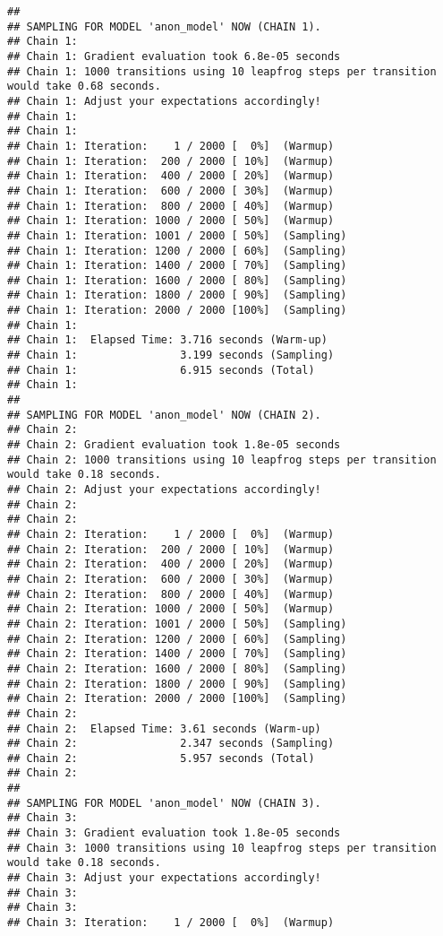 \documentclass[
]{article}
\begin{document}
\begin{verbatim}
## 
## SAMPLING FOR MODEL 'anon_model' NOW (CHAIN 1).
## Chain 1: 
## Chain 1: Gradient evaluation took 6.8e-05 seconds
## Chain 1: 1000 transitions using 10 leapfrog steps per transition would take 0.68 seconds.
## Chain 1: Adjust your expectations accordingly!
## Chain 1: 
## Chain 1: 
## Chain 1: Iteration:    1 / 2000 [  0%]  (Warmup)
## Chain 1: Iteration:  200 / 2000 [ 10%]  (Warmup)
## Chain 1: Iteration:  400 / 2000 [ 20%]  (Warmup)
## Chain 1: Iteration:  600 / 2000 [ 30%]  (Warmup)
## Chain 1: Iteration:  800 / 2000 [ 40%]  (Warmup)
## Chain 1: Iteration: 1000 / 2000 [ 50%]  (Warmup)
## Chain 1: Iteration: 1001 / 2000 [ 50%]  (Sampling)
## Chain 1: Iteration: 1200 / 2000 [ 60%]  (Sampling)
## Chain 1: Iteration: 1400 / 2000 [ 70%]  (Sampling)
## Chain 1: Iteration: 1600 / 2000 [ 80%]  (Sampling)
## Chain 1: Iteration: 1800 / 2000 [ 90%]  (Sampling)
## Chain 1: Iteration: 2000 / 2000 [100%]  (Sampling)
## Chain 1: 
## Chain 1:  Elapsed Time: 3.716 seconds (Warm-up)
## Chain 1:                3.199 seconds (Sampling)
## Chain 1:                6.915 seconds (Total)
## Chain 1: 
## 
## SAMPLING FOR MODEL 'anon_model' NOW (CHAIN 2).
## Chain 2: 
## Chain 2: Gradient evaluation took 1.8e-05 seconds
## Chain 2: 1000 transitions using 10 leapfrog steps per transition would take 0.18 seconds.
## Chain 2: Adjust your expectations accordingly!
## Chain 2: 
## Chain 2: 
## Chain 2: Iteration:    1 / 2000 [  0%]  (Warmup)
## Chain 2: Iteration:  200 / 2000 [ 10%]  (Warmup)
## Chain 2: Iteration:  400 / 2000 [ 20%]  (Warmup)
## Chain 2: Iteration:  600 / 2000 [ 30%]  (Warmup)
## Chain 2: Iteration:  800 / 2000 [ 40%]  (Warmup)
## Chain 2: Iteration: 1000 / 2000 [ 50%]  (Warmup)
## Chain 2: Iteration: 1001 / 2000 [ 50%]  (Sampling)
## Chain 2: Iteration: 1200 / 2000 [ 60%]  (Sampling)
## Chain 2: Iteration: 1400 / 2000 [ 70%]  (Sampling)
## Chain 2: Iteration: 1600 / 2000 [ 80%]  (Sampling)
## Chain 2: Iteration: 1800 / 2000 [ 90%]  (Sampling)
## Chain 2: Iteration: 2000 / 2000 [100%]  (Sampling)
## Chain 2: 
## Chain 2:  Elapsed Time: 3.61 seconds (Warm-up)
## Chain 2:                2.347 seconds (Sampling)
## Chain 2:                5.957 seconds (Total)
## Chain 2: 
## 
## SAMPLING FOR MODEL 'anon_model' NOW (CHAIN 3).
## Chain 3: 
## Chain 3: Gradient evaluation took 1.8e-05 seconds
## Chain 3: 1000 transitions using 10 leapfrog steps per transition would take 0.18 seconds.
## Chain 3: Adjust your expectations accordingly!
## Chain 3: 
## Chain 3: 
## Chain 3: Iteration:    1 / 2000 [  0%]  (Warmup)

\end{verbatim}
\end{document}

